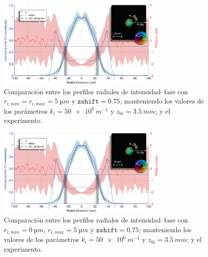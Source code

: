 \begin{figure}[htbp]
  \centering
  \includegraphics[width=0.75\textwidth]{Figuras/anx_cmp_49.png}
  \caption*{Comparación entre los perfiles radiales de intensidad--fase con $r_{i,min}=r_{i,max}=\qty{5}{µm}$ y $\texttt{zshift}=0.75$; manteniendo los valores de los parámetros $k_{i}=\qty{50e6}{m^{-1}}$ y $z_{0i}=\qty{3.5}{mm}$; y el experimento.}
\end{figure}

\begin{figure}[htbp]
  \centering
  \includegraphics[width=0.75\textwidth]{Figuras/anx_cmp_40.png}
  \caption*{Comparación entre los perfiles radiales de intensidad--fase con $r_{i,min}=\qty{0}{µm}$, $r_{i,max}=\qty{5}{µm}$ y $\texttt{zshift}=0.75$; manteniendo los valores de los parámetros $k_{i}=\qty{50e6}{m^{-1}}$ y $z_{0i}=\qty{3.5}{mm}$; y el experimento.}
\end{figure}

